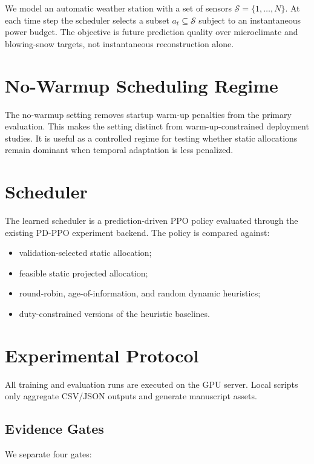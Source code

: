 \documentclass[11pt]{article}
\begin{document}
We model an automatic weather station with a set of sensors
$\mathcal{S}=\{1,\ldots,N\}$. At each time step the scheduler selects a subset
$a_t \subseteq \mathcal{S}$ subject to an instantaneous power budget. The
objective is future prediction quality over microclimate and blowing-snow
targets, not instantaneous reconstruction alone.

\section{No-Warmup Scheduling Regime}

The no-warmup setting removes startup warm-up penalties from the primary
evaluation. This makes the setting distinct from warm-up-constrained deployment
studies. It is useful as a controlled regime for testing whether static
allocations remain dominant when temporal adaptation is less penalized.

\section{Scheduler}

The learned scheduler is a prediction-driven PPO policy evaluated through the
existing PD-PPO experiment backend. The policy is compared against:

\begin{itemize}
  \item validation-selected static allocation;
  \item feasible static projected allocation;
  \item round-robin, age-of-information, and random dynamic heuristics;
  \item duty-constrained versions of the heuristic baselines.
\end{itemize}

\section{Experimental Protocol}

All training and evaluation runs are executed on the GPU server. Local scripts
only aggregate CSV/JSON outputs and generate manuscript assets.

\subsection{Evidence Gates}

We separate four gates:
\end{document}
